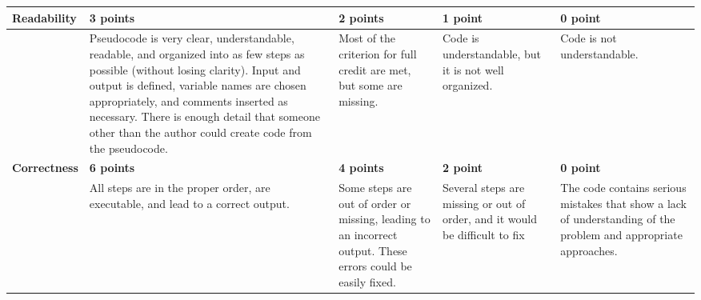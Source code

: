 \documentclass[12pt,landscape]{article}
\begin{document}
{\renewcommand{\arraystretch}{2}
\begin{tabular}{|p{2.3cm}|p{6cm}|p{4.2cm}|p{4.2cm}|p{4.2cm}|}
\hline
{\bf Readability }& {\bf 3 points} & {\bf 2 points} & {\bf 1 point}& {\bf 0 point} \\
\hline
& 
 Pseudocode is very clear, understandable, readable, and organized into as few steps as possible (without losing clarity). Input and output is defined, variable names are chosen appropriately, and comments inserted as necessary. There is enough detail that someone other than the author could create code from the pseudocode.& 
 Most of the criterion for full credit are met, but some are missing. & Code is understandable, but it is not well organized. & 
 Code is not understandable.\\
 \hline
{\bf Correctness }& {\bf 6 points} & {\bf 4 points} & {\bf 2 point}& {\bf 0 point} \\
\hline
&All steps are in the proper order, are executable, and lead to a correct output.& Some steps are out of order or missing, leading to an incorrect output. These errors could be easily fixed. & 
Several steps are missing or out of order, and it would be difficult to fix& The code contains serious mistakes that show a lack of understanding of the problem and appropriate approaches.\\
\hline

 \end{tabular}
}
\end{document}
